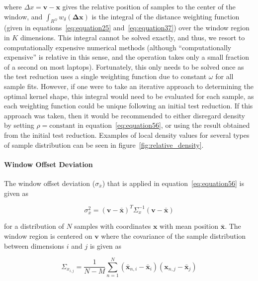 where $\Delta x = \bm{v} - \bm{x}$ gives the relative position of samples to
the center of the window, and
$\int_{R^{\Omega}} w_{\delta}(\mathbf{\Delta x})$ is the integral of the
distance weighting function (given in equations~\ref{eq:equation25}
and~\ref{eq:equation37}) over the window region in $K$ dimensions.
This integral cannot be solved exactly, and thus, we resort to computationally
expensive numerical methods (although ``computationally expensive'' is relative
in this sense, and the operation takes only a small fraction of a second on
most laptops).
Fortunately, this only needs to be solved once as the test reduction uses a
single weighting function due to constant $\omega$ for all sample fits.
However, if one were to take an iterative approach to determining the optimal
kernel shape, this integral would need to be evaluated for each sample, as each
weighting function could be unique following an initial test reduction.
If this approach was taken, then it would be recommended to either disregard
density by setting $\rho=\text{constant}$ in equation~\ref{eq:equation56}, or
using the result obtained from the initial test reduction.
Examples of local density values for several types of sample distribution can
be seen in figure~\ref{fig:relative_density}.

\paragraph{Window Offset Deviation}
\label{paragraph:window-offset-deviation}

The window offset deviation ($\sigma_{\bar{x}}$) that is applied in
equation~\ref{eq:equation56} is given as

\begin{equation}
    \sigma_{\bar{x}}^2 = (\bm{v} - \bar{\bm{x}})^{T}
        \Sigma_{x}^{-1} (\bm{v} - \bar{\bm{x}})
    \label{eq:equation60}
\end{equation}

for a distribution of $N$ samples with coordinates $\bm{x}$ with mean position
$\bar{\bm{x}}$.
The window region is centered on $\bm{v}$ where the covariance of the sample
distribution between dimensions $i$ and $j$ is given as

\begin{equation}
        \Sigma_{x_{i,j}} = \frac{1}{N - M} \sum_{n=1}^{N}
            {(\bar{\bm{x}}_{n, i} - \bar{\bm{x}}_i)
             (\bm{x}_{n, j} - \bar{\bm{x}}_j)}
    \label{eq:equation61}
\end{equation}

